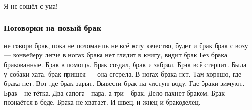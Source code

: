 \begin{epigraph}
    Я не сошёл с ума!\\
\end{epigraph}

\subsubsection{Поговорки на новый брак}


не говори брак, пока не поломаешь
не всё коту качество, будет и брак
брак с возу — конвейеру легче
в ногах брака нет
глядит в книгу, видит брак
Без брака бракованные.
Брак в помощь.
Брак создал, брак и забрал.
Брак всё стерпит.
Была у собаки хата, брак пришел — она сгорела.
В ногах брака нет.
Там хорошо, где брака нет.
Вот где брак зарыт.
Вывести брак на чистую воду.
Где браки зимуют.
Брак - не тётка.
Два сапога - пара, а три - брак.
Дело пахнет браком.
Брак познаётся в беде.
Брака не хватает.
И швец, и жнец и бракоделец.



